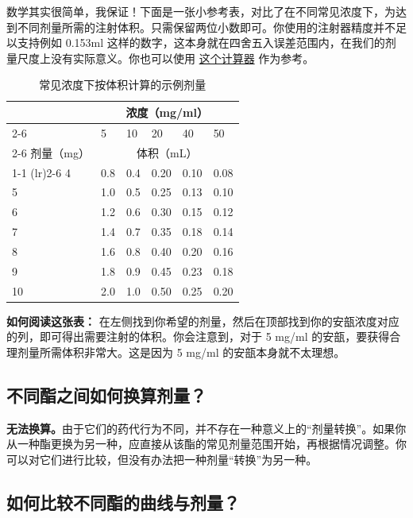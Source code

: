 \documentclass{article}
\begin{document}
数学其实很简单，我保证！下面是一张小参考表，对比了在不同常见浓度下，为达到不同剂量所需的注射体积。只需保留两位小数即可。你使用的注射器精度并不足以支持例如 0.153ml 这样的数字，这本身就在四舍五入误差范围内，在我们的剂量尺度上没有实际意义。你也可以使用 \href{https://hrtcafe.net/Calc/}{这个计算器} 作为参考。

\begin{table}
\centering
\caption{常见浓度下按体积计算的示例剂量}
\label{tab:concentrations}
\begin{tabular}{@{}llllll@{}}
  \toprule
  \multicolumn{1}{c}{} & \multicolumn{5}{c}{浓度（mg/ml）} \\
  \cmidrule(rl){2-6}
            & 5    & 10  & 20 & 40 & 50   \\
            \cmidrule(rl){2-6}
剂量（mg） & \multicolumn{5}{c}{体积（mL）}  \\
    \cmidrule(r){1-1} \cmidrule(lr){2-6}
4        & 0.8  & 0.4 & 0.20  & 0.10 & 0.08\\
5        & 1.0    & 0.5 & 0.25 & 0.13 &  0.10\\
6        & 1.2  & 0.6   & 0.30  & 0.15 & 0.12   \\
7        & 1.4  & 0.7 & 0.35  & 0.18 & 0.14\\
8        & 1.6  & 0.8   & 0.40  & 0.20 & 0.16  \\
9        & 1.8  & 0.9 & 0.45  & 0.23 & 0.18\\
10       & 2.0    & 1.0   & 0.50  & 0.25 & 0.20 \\
  \bottomrule
\end{tabular}
\end{table}

\textbf{如何阅读这张表：} 在左侧找到你希望的剂量，然后在顶部找到你的安瓿浓度对应的列，即可得出需要注射的体积。你会注意到，对于 5 mg/ml 的安瓿，要获得合理剂量所需体积非常大。这是因为 5 mg/ml 的安瓿本身就不太理想。

\subsection{不同酯之间如何换算剂量？}

\textbf{无法换算。}由于它们的药代行为不同，并不存在一种意义上的“剂量转换”。如果你从一种酯更换为另一种，应直接从该酯的常见剂量范围开始，再根据情况调整。你可以对它们进行比较，但没有办法把一种剂量“转换”为另一种。

\subsection{如何比较不同酯的曲线与剂量？}
\end{document}
